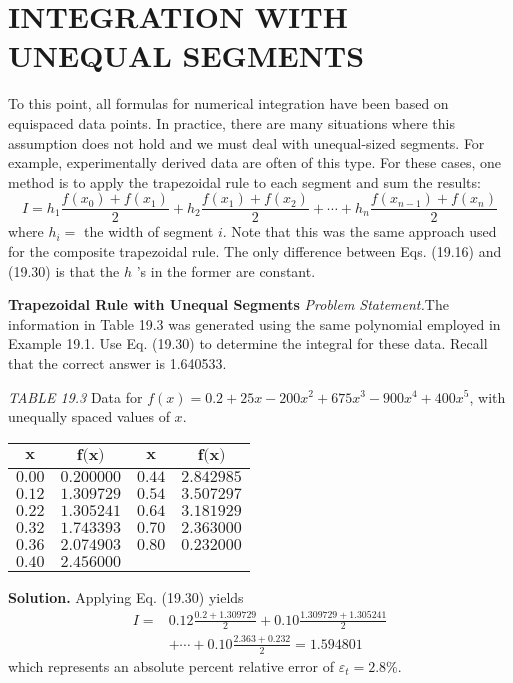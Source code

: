 \documentclass[../main.tex]{subfiles}
\begin{document}
\section{INTEGRATION WITH UNEQUAL SEGMENTS}
To this point, all formulas for numerical integration have been based on equispaced data
points. In practice, there are many situations where this assumption does not hold and we
must deal with unequal-sized segments. For example, experimentally derived data are
often of this type. For these cases, one method is to apply the trapezoidal rule to each segment and sum the results:
\begin{equation}
    \tag{19.30}
I=h_{1} \frac{f\left(x_{0}\right)+f\left(x_{1}\right)}{2}+h_{2} \frac{f\left(x_{1}\right)+f\left(x_{2}\right)}{2}+\cdots+h_{n} \frac{f\left(x_{n-1}\right)+f\left(x_{n}\right)}{2}
\end{equation}
where $h_{i}=$ the width of segment $i$. Note that this was the same approach used for the composite trapezoidal rule. The only difference between Eqs. (19.16) and (19.30) is that the $h$ 's in the former are constant.

\begin{exmp} \textbf{Trapezoidal Rule with Unequal Segments}
    \noindent\textit{Problem Statement.}The information in Table 19.3 was generated using the same polynomial employed in Example 19.1. Use Eq. (19.30) to determine the integral for these data.
	Recall that the correct answer is 1.640533.	

	\textit{TABLE 19.3} Data for $f(x)=0.2+25 x-200 x^{2}+675 x^{3}-900 x^{4}+400 x^{5}$, with unequally spaced values of $x$.\\
	\begin{center}
\begin{tabular}{cccc}
	\hline $\boldsymbol{x}$ & $\boldsymbol{f}(\boldsymbol{x} \boldsymbol{)}$ & $\boldsymbol{x}$ & $\boldsymbol{f}(\boldsymbol{x} \boldsymbol{)}$ \\
	\hline $0.00$ & $0.200000$ & $0.44$ & $2.842985$ \\
$0.12$ & $1.309729$ & $0.54$ & $3.507297$ \\
$0.22$ & $1.305241$ & $0.64$ & $3.181929$ \\
$0.32$ & $1.743393$ & $0.70$ & $2.363000$ \\
$0.36$ & $2.074903$ & $0.80$ & $0.232000$ \\
$0.40$ & $2.456000$ & & \\
\hline
\end{tabular}
\end{center}
    \noindent \textbf{Solution.} Applying Eq. (19.30) yields
	$$
	\begin{aligned}
	I=& 0.12 \frac{0.2+1.309729}{2}+0.10 \frac{1.309729+1.305241}{2} \\
	&+\cdots+0.10 \frac{2.363+0.232}{2}=1.594801
	\end{aligned}
	$$
	which represents an absolute percent relative error of $\varepsilon_{t}=2.8 \%$.
\end{exmp}
\end{document}
